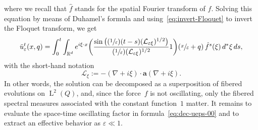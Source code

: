 \documentclass[JEP,XML,SOM,Unicode,published]{cedram}
\newcommand{\Psfrac}[2]{(\sfrac{#1}{#2})}
\theoremstyle{plain}
\theoremstyle{definition}
\numberwithin{equation}{section}
\newcommand{\e}{\varepsilon}
\newcommand{\Lc}{\mathcal{L}}
\newcommand{\R}{\mathbb R}
\newcommand{\Aa}{\boldsymbol a}
\newcommand{\Ld}{\operatorname{L}}
\begin{document}
where we recall that $\hat f$ stands for the spatial Fourier transform of $f$.
Solving this equation by means of Duhamel's formula and using~\eqref{eq:invert-Floquet} to invert the Floquet transform, we get
\begin{equation}\label{eq:dec-ueps-00}
\tilde u_\e^t(x,q)=\int_0^t\int_{\R^d}e^{i\xi\cdot x} \bigg(\frac{\sin\big(\Psfrac1\e(t-s)(\Lc_{\e \xi})^{1/2}\big)}{\Psfrac1\e(\Lc_{\e \xi})^{1/2}}1\bigg)(\sfrac x\e+q)\,\hat f^s(\xi)\,d^*\xi\,ds,
\end{equation}
with the short-hand notation
\begin{equation}\label{eq:defLxi}
\Lc_{\xi}:=-(\nabla+i\xi)\cdot\Aa(\nabla+i\xi).
\end{equation}
In other words, the solution can be decomposed as a superposition of fibered evolutions on $\Ld^2(Q)$, and, since the force~$f$ is not oscillating, only the fibered spectral measures associated with the constant function~$1$ matter.
It remains to evaluate the space-time oscillating factor in formula~\eqref{eq:dec-ueps-00} and to extract an effective behavior as $\e\ll1$.
\end{document}
